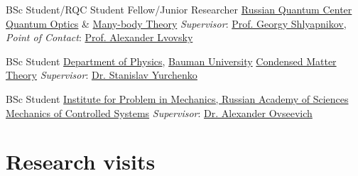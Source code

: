 \documentclass[10pt,a4paper,sans]{moderncv}
\begin{document}
	{BSc Student/RQC Student Fellow/Junior Researcher}
	{\textcolor{blue}{\href{http://rqc.ru}{Russian Quantum Center}}}
	{\textcolor{blue}{\href{http://www.rqc.ru/groups/lvovsky/}{Quantum Optics}} \& 
	\textcolor{blue}{\href{http://www.rqc.ru/groups/shlyapnikov/}{Many-body Theory}}}
	{\textit{Supervisor}: \textcolor{blue}{\href{http://www.rqc.ru/members/georgy.shlyapnikov/}{Prof. Georgy Shlyapnikov}},
	{\textit{Point of Contact}: \textcolor{blue}{\href{http://www.rqc.ru/members/alexander.lvovsky/}{Prof. Alexander Lvovsky}}}}{}
	
	
	
	{BSc Student}
	{\textcolor{blue}{\href{http://fn.bmstu.ru/index.php/fn4}{Department of Physics}}, \textcolor{blue}{\textcolor{blue}{\href{http://bmstu.ru}{Bauman University}}}}
	{\newline \textcolor{blue}{\href{http://teratech.ru/en}{Condensed Matter Theory}}}
	{\textit{Supervisor}: \textcolor{blue}{\href{http://teratech.ru/en/peoples}{Dr. Stanislav Yurchenko}}}{}

	{BSc Student}
	{\textcolor{blue}{\href{http://www.ipmnet.ru}{Institute for Problem in Mechanics, Russian Academy of Sciences}}}
	{\newline \textcolor{blue}{\href{http://www.ipmnet.ru/lab02.htm}{Mechanics of Controlled Systems}}}
	{\textit{Supervisor}: \textcolor{blue}{\href{http://www.ipmnet.ru/lab02/Ovseevich.htm}{Dr. Alexander Ovseevich}}}{}
	
\section{Research visits}
\end{document}
